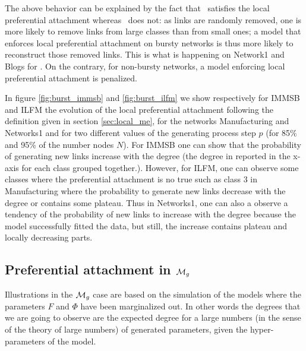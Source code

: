 The above behavior can be explained by the fact that \imb\ satisfies the local preferential attachment whereas \ifm\ does not: as links are randomly removed, one is more likely to remove links from large classes than from small ones; a model that enforces local preferential attachment on bursty networks is thus more likely to reconstruct those removed links. This is what is happening on Network1 and Blogs for \imb. On the contrary, for non-bursty networks, a model enforcing local preferential attachment is penalized.

In figure \ref{fig:burst_immsb} and \ref{fig:burst_ilfm} we show respectively for IMMSB and ILFM the evolution of the local preferential attachment following the definition given in section \ref{sec:local_me}, for the networks Manufacturing and Networks1 and for two different values of the generating process step $p$ (for 85\% and 95\% of the number nodes $N$). For IMMSB one can show that the probability of generating new links increase with the degree (the degree in reported in the x-axis for each class grouped together.). However, for ILFM, one can observe some classes where the preferential attachment is no true such as class 3 in Manufacturing where the probability to generate new links decrease with the degree or contains some plateau. Thus in Networks1, one can also a observe a tendency of the probability of new links to increase with the degree because the model successfully fitted the data, but still, the increase contains plateau and locally decreasing parts.

\begin{figure}[h]
\centering

\end{figure}

\begin{figure}[h]
\centering

\end{figure}


\subsection{Preferential attachment in $\mathcal{M}_g$}

Illustrations in the $\mathcal{M}_g$ case are based on the simulation of the models where the parameters $F$ and $\Phi$ have been marginalized out. In other words the degrees that we are going to observe are the expected degree for a large numbers (in the sense of the theory of large numbers) of generated parameters, given the hyper-parameters of the model. ~\\

